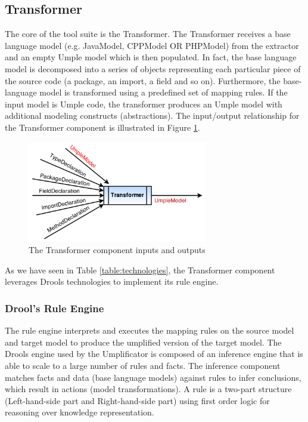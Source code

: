 \subsection{Transformer}

The core of the tool suite is the Transformer. The Transformer receives a base language model (e.g. JavaModel, CPPModel OR PHPModel) from the extractor and an empty Umple model which is then populated. In fact, the base language model is decomposed into a series of objects representing each particular piece of the source code (a package, an import, a field and so on). Furthermore, the base-language model is transformed using a predefined set of mapping rules. If the input model is Umple code, the transformer produces an Umple model with additional modeling constructs (abstractions). The input/output relationship for the Transformer component is illustrated in Figure 
\ref{fig:transformerInOut}.

\begin{figure}[h]
\centering
\includegraphics[width=0.70\textwidth]{Figures/transformerINOut.png}
\caption{The Transformer component inputs and outputs}
\label{fig:transformerInOut}
\end{figure}

As we have seen in Table \ref{table:technologies}, the Transformer component leverages Drools technologies to implement its rule engine.

\subsubsection{Drool's Rule Engine}

The rule engine interprets and executes the mapping rules on the source model and target model to produce the umplified version of the target model.
The Drools engine used by the Umplificator is composed of an inference engine that is able to scale to a large number of rules and facts.  The inference component matches facts and data (base language models) against rules to infer conclusions, which result in actions (model transformations). A rule is a two-part structure (Left-hand-side part and Right-hand-side part) using first order logic for reasoning over knowledge representation.

